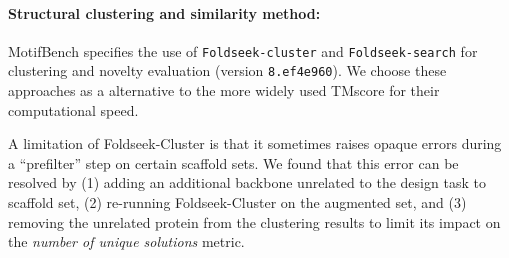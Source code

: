 \paragraph{Structural clustering and similarity method:}
MotifBench specifies the use of \texttt{Foldseek-cluster} \citep{barrio2023clustering} and \texttt{Foldseek-search} \citep{van2024fast} for clustering and novelty evaluation (version \texttt{8.ef4e960}).
We choose these approaches as a alternative to the more widely used TMscore \citep{zhang2005tm} for their computational speed.

A limitation of Foldseek-Cluster is that it sometimes raises opaque errors during a ``prefilter'' step on certain scaffold sets.
We found that this error can be resolved by (1) adding an additional backbone unrelated to the design task to scaffold set, (2) re-running Foldseek-Cluster on the augmented set, and (3) removing the unrelated protein from the clustering results to limit its impact on the \emph{number of unique solutions} metric.

